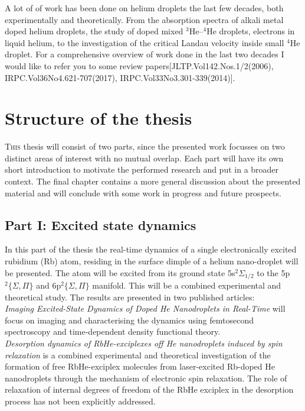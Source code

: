 \documentclass[12pt,a4paper]{book}
\begin{document}
	A lot of of work has been done on helium droplets the last few decades, both experimentally and theoretically. From the absorption spectra of alkali metal doped helium droplets, the study of doped mixed $^3$He--$^4$He droplets, electrons in liquid helium, to the investigation of the critical Landau velocity inside small $^4$He droplet. For a comprehensive overview of work done in the last two decades I would like to refer you to some review papers[JLTP.Vol142.Nos.1/2(2006), IRPC.Vol36No4.621-707(2017), IRPC.Vol33No3.301-339(2014)].

	\clearpage	
	\section{Structure of the thesis}
		\lettrine[lines=3,findent=3pt,nindent=0pt]{T}{his} thesis will consist of two parts, since the presented work focusses on two distinct areas of interest with no mutual overlap. Each part will have its own short introduction to motivate the performed research and put in a broader context. The final chapter contains a more general discussion about the presented material and will conclude with some work in progress and future prospects.

		\subsection{Part I: Excited state dynamics}
			In this part of the thesis the real-time dynamics of a single electronically excited rubidium (Rb) atom, residing in the surface dimple of a helium nano-droplet will be presented. The atom will be excited from its ground state 5s$^2\Sigma_{1/2}$ to the 5p$^2\{\Sigma,\Pi\}$ and 6p$^2\{\Sigma,\Pi\}$ manifold. This will be a combined experimental and theoretical study. The results are presented in two published articles:\\
		
			\emph{Imaging Excited-State Dynamics of Doped He Nanodroplets in Real-Time} will focus on imaging and characterising the dynamics using femtosecond spectroscopy and  time-dependent density functional theory.\\
		
			\emph{Desorption dynamics of RbHe-exciplexes off He nanodroplets induced by spin relaxation} is a combined experimental and theoretical investigation of the formation of free RbHe-exciplex molecules from laser-excited Rb-doped He nanodroplets through the mechanism of electronic spin relaxation. The role of relaxation of internal degrees of freedom of the RbHe exciplex in the desorption process has not been explicitly addressed.
\end{document}
